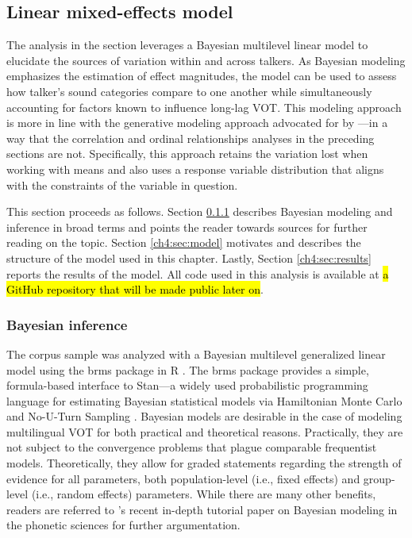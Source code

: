 \subsection{Linear mixed-effects model}\label{ch4:sec:lmem}

The analysis in the section leverages a Bayesian multilevel linear model to elucidate the sources of variation within and across talkers. As Bayesian modeling emphasizes the estimation of effect magnitudes, the model can be used to assess how talker's sound categories compare to one another while simultaneously accounting for factors known to influence long-lag VOT. This modeling approach is more in line with the generative modeling approach advocated for by \citet{haines_2020_theoretically}---in a way that the correlation and ordinal relationships analyses in the preceding sections are not. Specifically, this approach retains the variation lost when working with means and also uses a response variable distribution that aligns with the constraints of the variable in question. 

This section proceeds as follows. Section \ref{ch4:sec:bayesianinference} describes Bayesian modeling and inference in broad terms and points the reader towards sources for further reading on the topic. Section \ref{ch4:sec:model} motivates and describes the structure of the model used in this chapter. Lastly, Section \ref{ch4:sec:results} reports the results of the model. All code used in this analysis is available at \hl{a GitHub repository that will be made public later on}.

\subsubsection{Bayesian inference}\label{ch4:sec:bayesianinference}

The corpus sample was analyzed with a Bayesian multilevel generalized linear model using the brms package in R \citep{burkner_2017_brms, r_2021}. The brms package provides a simple, formula-based interface to Stan---a widely used probabilistic programming language for estimating Bayesian statistical models via Hamiltonian Monte Carlo and No-U-Turn Sampling \citep{stan_2021}. Bayesian models are desirable in the case of modeling multilingual VOT for both practical and theoretical reasons. Practically, they are not subject to the convergence problems that plague comparable frequentist models. Theoretically, they allow for graded statements regarding the strength of evidence for all parameters, both population-level (i.e., fixed effects) and group-level (i.e., random effects) parameters. While there are many other benefits, readers are referred to \citeauthor{vasishth_2018_bayesian}'s \citeyearpar{vasishth_2018_bayesian} recent in-depth tutorial paper on Bayesian modeling in the phonetic sciences for further argumentation. 

